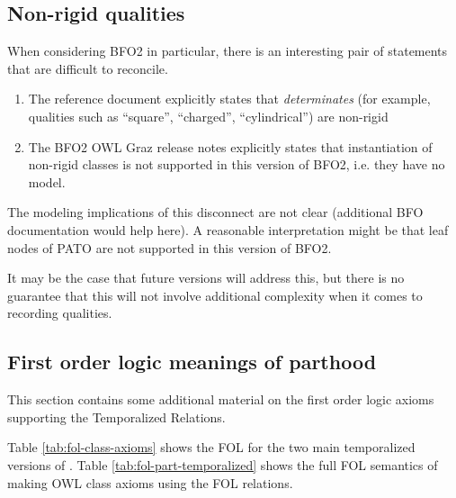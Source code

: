 \documentclass{bioinfo}
\def\partOf{\pr{part\_of}}
\begin{document}
\subsection{Non-rigid qualities}

When considering BFO2 in particular, there is an interesting
pair of statements that are difficult to reconcile.

\begin{enumerate}

\item The reference document\cite{BFO2Ref} explicitly states that
  \emph{determinates} (for example, qualities such as ``square'',
  ``charged'', ``cylindrical'') are non-rigid

\item The BFO2 OWL Graz release notes\cite{Graz} explicitly states that
  instantiation of non-rigid classes is not supported in this version
  of BFO2, i.e. they have no model.

\end{enumerate}

The modeling implications of this disconnect are not clear (additional
BFO documentation would help here). A reasonable interpretation might
be that leaf nodes of PATO are not supported in this version of BFO2.

It may be the case that future versions will address this, but there
is no guarantee that this will not involve additional complexity when
it comes to recording qualities.



\subsection{First order logic meanings of parthood}

This section contains some additional material on the first order
logic axioms supporting the Temporalized Relations. 

Table \ref{tab:fol-class-axioms} shows the FOL for the two main
temporalized versions of \partOf. Table
\ref{tab:fol-part-temporalized} shows the full FOL semantics of making
OWL class axioms using the FOL relations.
\end{document}
